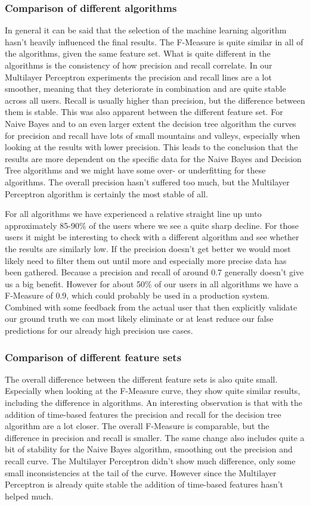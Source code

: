 \subsubsection{Comparison of different algorithms}
In general it can be said that the selection of the machine learning algorithm hasn't heavily influenced the final results. The F-Measure is quite similar in all of the algorithms, given the same feature set. What is quite different in the algorithms is the consistency of how precision and recall correlate. In our Multilayer Perceptron experiments the precision and recall lines are a lot smoother, meaning that they deteriorate in combination and are quite stable across all users. Recall is usually higher than precision, but the difference between them is stable. This was also apparent between the different feature set. For Naive Bayes and to an even larger extent the decision tree algorithm the curves for precision and recall have lots of small mountains and valleys, especially when looking at the results with lower precision. This leads to the conclusion that the results are more dependent on the specific data for the Naive Bayes and Decision Tree algorithms and we might have some over- or underfitting for these algorithms. The overall precision hasn't suffered too much, but the Multilayer Perceptron algorithm is certainly the most stable of all.

For all algorithms we have experienced a relative straight line up unto approximately 85-90\% of the users where we see a quite sharp decline. For those users it might be interesting to check with a different algorithm and see whether the results are similarly low. If the precision doesn't get better we would most likely need to filter them out until more and especially more precise data has been gathered. Because a precision and recall of around 0.7 generally doesn't give us a big benefit. However for about 50\% of our users in all algorithms we have a F-Measure of 0.9, which could probably be used in a production system. Combined with some feedback from the actual user that then explicitly validate our ground truth we can most likely eliminate or at least reduce our false predictions for our already high precision use cases.

\subsubsection{Comparison of different feature sets}
The overall difference between the different feature sets is also quite small. Especially when looking at the F-Measure curve, they show quite similar results, including the difference in algorithms. An interesting observation is that with the addition of time-based features the precision and recall for the decision tree algorithm are a lot closer. The overall F-Measure is comparable, but the difference in precision and recall is smaller. The same change also includes quite a bit of stability for the Naive Bayes algorithm, smoothing out the precision and recall curve. The Multilayer Perceptron didn't show much difference, only some small inconsistencies at the tail of the curve. However since the Multilayer Perceptron is already quite stable the addition of time-based features hasn't helped much.

